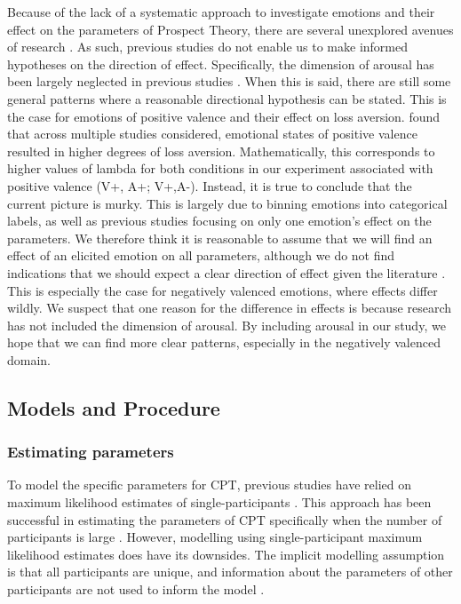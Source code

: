 \documentclass{article}
\begin{document}
Because of the lack of a systematic approach to investigate emotions and their effect on the parameters of Prospect Theory, there are several unexplored avenues of research \cite{prietzel2020mrq}. As such, previous studies do not enable us to make informed hypotheses on the direction of effect. Specifically, the dimension of arousal has been largely neglected in previous studies \cite{prietzel2020mrq}. When this is said, there are still some general patterns where a reasonable directional hypothesis can be stated. This is the case for emotions of positive valence and their effect on loss aversion.  found that across multiple studies considered, emotional states of positive valence resulted in higher degrees of loss aversion. Mathematically, this corresponds to higher values of lambda for both conditions in our experiment associated with positive valence (V+, A+; V+,A-). 
Instead, it is true to conclude that the current picture is murky. This is largely due to binning emotions into categorical labels, as well as previous studies focusing on only one emotion’s effect on the parameters. We therefore think it is reasonable to assume that we will find an effect of an elicited emotion on all parameters, although we do not find indications that we should expect a clear direction of effect given the literature \cite{prietzel2020mrq}. This is especially the case for negatively valenced emotions, where effects differ wildly. We suspect that one reason for the difference in effects is because research has not included the dimension of arousal. By including arousal in our study, we hope that we can find more clear patterns, especially in the negatively valenced domain. 

    \subsection{Models and Procedure}
    \subsubsection{Estimating parameters}
    To model the specific parameters for CPT, previous studies have relied on maximum likelihood estimates of single-participants \cite{nilsson2011jomp}. This approach has been successful in estimating the parameters of CPT specifically when the number of participants is large \cite{harrison2009expected}. However, modelling using single-participant maximum likelihood estimates does have its downsides. The implicit modelling assumption is that all participants are unique, and information about the parameters of other participants are not used to inform the model \cite{nilsson2011jomp}. 
\end{document}

